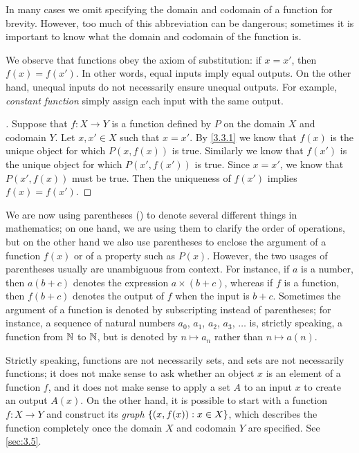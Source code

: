 \begin{note}
  In many cases we omit specifying the domain and codomain of a function for brevity.
  However, too much of this abbreviation can be dangerous;
  sometimes it is important to know what the domain and codomain of the function is.
\end{note}

\begin{ac}\label{ac:3.3.1}
  We observe that functions obey the axiom of substitution:
  if \(x = x'\), then \(f(x) = f(x')\).
  In other words, equal inputs imply equal outputs.
  On the other hand, unequal inputs do not necessarily ensure unequal outputs.
  For example, \emph{constant function} simply assign each input with the same output.
\end{ac}

\begin{proof}[]
  Suppose that \(f : X \to Y\) is a function defined by \(P\) on the domain \(X\) and codomain \(Y\).
  Let \(x, x' \in X\) such that \(x = x'\).
  By \cref{3.3.1} we know that \(f(x)\) is the unique object for which \(P(x, f(x))\) is true.
  Similarly we know that \(f(x')\) is the unique object for which \(P(x', f(x'))\) is true.
  Since \(x = x'\), we know that \(P(x', f(x))\) must be true.
  Then the uniqueness of \(f(x')\) implies \(f(x) = f(x')\).
\end{proof}

\setcounter{thm}{4}
\begin{rmk}\label{3.3.5}
  We are now using parentheses () to denote several different things in mathematics;
  on one hand, we are using them to clarify the order of operations, but on the other hand we also use parentheses to enclose the argument of a function \(f(x)\) or of a property such as \(P(x)\).
  However, the two usages of parentheses usually are unambiguous from context.
  For instance, if \(a\) is a number, then \(a(b + c)\) denotes the expression \(a \times (b + c)\), whereas if \(f\) is a function, then \(f(b + c)\) denotes the output of \(f\) when the input is \(b + c\).
  Sometimes the argument of a function is denoted by subscripting instead of parentheses;
  for instance, a sequence of natural numbers \(a_0\), \(a_1\), \(a_2\), \(a_3\), \(\dots\) is, strictly speaking, a function from \(\mathbb{N}\) to \(\mathbb{N}\), but is denoted by \(n \mapsto a_n\) rather than \(n \mapsto a(n)\).
\end{rmk}

\begin{rmk}\label{3.3.6}
  Strictly speaking, functions are not necessarily sets, and sets are not necessarily functions;
  it does not make sense to ask whether an object \(x\) is an element of a function \(f\), and it does not make sense to apply a set \(A\) to an input \(x\) to create an output \(A(x)\).
  On the other hand, it is possible to start with a function \(f : X \to Y\) and construct its \emph{graph} \(\left\lbrace(x, f(x)) : x \in X\right\rbrace\), which describes the function completely once the domain \(X\) and codomain \(Y\) are specified.
  See \cref{sec:3.5}.
\end{rmk}

